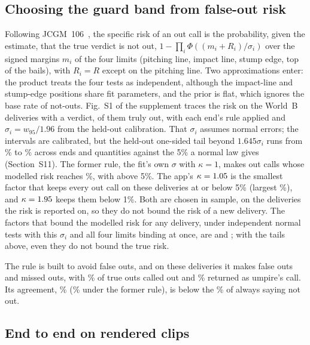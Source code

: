 \documentclass[journal]{IEEEtran}
\begin{document}
\subsection{Choosing the guard band from false-out risk}
\label{sec:kcurve}

Following JCGM~106~\cite{jcgm106}, the specific risk of an out call is the probability, given the estimate,
that the true verdict is not out, $1 - \prod_i \Phi((m_i + R_i)/\sigma_i)$ over the signed margins $m_i$
of the four limits (pitching line, impact line, stump edge, top of the bails), with $R_i = R$ except on the
pitching line. Two approximations enter: the product treats the four tests as independent, although the
impact-line and stump-edge positions share fit parameters, and the prior is flat, which ignores the base
rate of not-outs. Fig.~S1 of the supplement traces the risk on the \RiskN{} World~B deliveries with a
verdict, \RiskTruthOut{} of them truly out, with each end's rule applied and $\sigma_i = w_{95}/1.96$ from
the held-out calibration. That $\sigma_i$ assumes normal errors; the intervals are calibrated, but the
held-out one-sided tail beyond $1.645\sigma_i$ runs from \CalExceedMin\% to \CalExceedMax\% across ends and
quantities against the 5\% a normal law gives (Section~S11). The former rule, the fit's own $\sigma$ with $\kappa = 1$,
makes out calls whose modelled risk reaches \RiskFormerMaxSpecCal\%, with \RiskFormerOutsOverFiveCal{}
above 5\%. The app's $\kappa = 1.05$ is the smallest factor that keeps every out call on these
deliveries at or below 5\% (largest \RiskShippedMaxSpecCal\%), and $\kappa = 1.95$ keeps them
below 1\%. Both are chosen in sample, on the deliveries the risk is reported on, so they do not bound the
risk of a new delivery. The factors that bound the modelled risk for any delivery, under independent normal
tests with this $\sigma_i$ and all four limits binding at once, are \RiskBoundFourFive{} and
\RiskBoundFourOne; with the tails above, even they do not bound the true risk.

The rule is built to avoid false outs, and on these deliveries it makes \RiskCalFalseOutFive{}
false outs and \RiskCalMissedOutFive{} missed outs, with \RiskCalOutRecallFive\% of true outs called out and
\RiskCalOutToUmpFive\% returned as umpire's call. Its agreement, \RiskCalAgreeFive\% (\RiskFitKOneAgree\%
under the former rule), is below the \RiskAlwaysNotOutPct\% of always saying not out.

\subsection{End to end on rendered clips}
\end{document}
